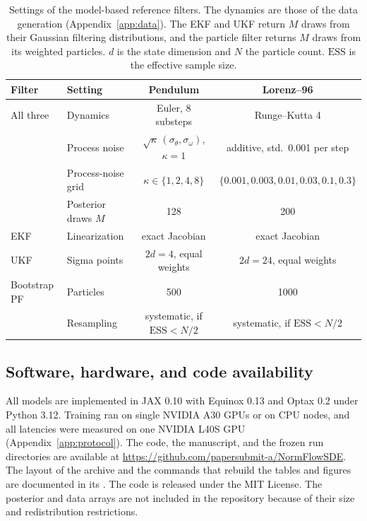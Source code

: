 \begin{table}[htbp]
\centering\footnotesize
\begin{tabular}{llcc}
\toprule
Filter & Setting & Pendulum & Lorenz--96 \\
\midrule
All three & Dynamics & Euler, 8 substeps & Runge--Kutta 4 \\
 & Process noise & $\sqrt{\kappa}\,(\sigma_\theta,\sigma_\omega)$, $\kappa=1$ & additive, std.\ 0.001 per step \\
 & Process-noise grid & $\kappa\in\{1,2,4,8\}$ & $\{0.001,0.003,0.01,0.03,0.1,0.3\}$ \\
 & Posterior draws $M$ & 128 & 200 \\
\midrule
EKF & Linearization & exact Jacobian & exact Jacobian \\
\midrule
UKF & Sigma points & $2d=4$, equal weights & $2d=24$, equal weights \\
\midrule
Bootstrap PF & Particles & 500 & 1000 \\
 & Resampling & systematic, if $\mathrm{ESS}<N/2$ & systematic, if $\mathrm{ESS}<N/2$ \\
\bottomrule
\end{tabular}
\caption{Settings of the model-based reference filters. The dynamics are those of the data generation (Appendix~\ref{app:data}). The EKF and UKF return $M$ draws from their Gaussian filtering distributions, and the particle filter returns $M$ draws from its weighted particles. $d$ is the state dimension and $N$ the particle count. $\mathrm{ESS}$ is the effective sample size.}
\label{tab:reference-hparams}
\end{table}

\subsection{Software, hardware, and code availability}\label{app:scripts}
All models are implemented in JAX 0.10 with Equinox 0.13 and Optax 0.2 under Python 3.12. Training ran on single NVIDIA A30 GPUs or on CPU nodes, and all latencies were measured on one NVIDIA L40S GPU (Appendix~\ref{app:protocol}). The code, the manuscript, and the frozen run directories are available at \url{https://github.com/papersubmit-a/NormFlowSDE}. The layout of the archive and the commands that rebuild the tables and figures are documented in its . The code is released under the MIT License. The posterior and data arrays are not included in the repository because of their size and redistribution restrictions.